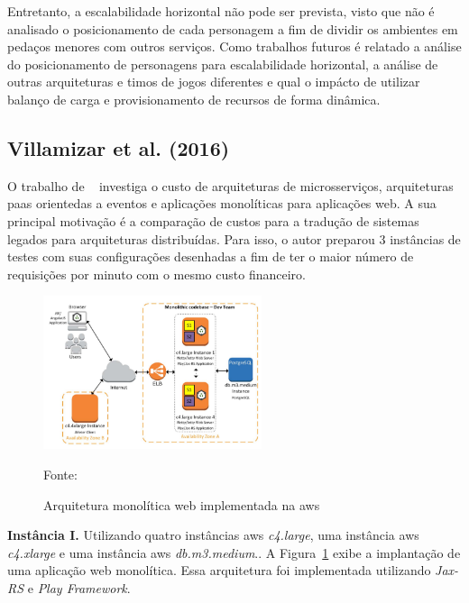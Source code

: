 Entretanto, a escalabilidade horizontal não pode ser prevista, visto que não é analisado o posicionamento de cada personagem a fim de dividir os ambientes em pedaços menores com outros serviços.
%
Como trabalhos futuros é relatado a análise do posicionamento de personagens para escalabilidade horizontal, a análise de outras arquiteturas e timos de jogos diferentes e qual o impácto de utilizar balanço de carga e provisionamento de recursos de forma dinâmica.



\subsection{Villamizar et al. (2016)}



O trabalho de ~\cite{7515686} investiga o custo de arquiteturas de microsserviços, arquiteturas \ac{paas} orientedas a eventos e aplicações monolíticas para aplicações web.
%
A sua principal motivação é a comparação de custos para a tradução de sistemas legados para arquiteturas distribuídas.
%
Para isso, o autor preparou 3 instâncias de testes com suas configurações desenhadas a fim de ter o maior número de requisições por minuto com o mesmo custo financeiro.



\begin{figure}[htb!]
\caption{Arquitetura monolítica web implementada na \ac{aws}}
\label{fig:aws_monolitico}
\includegraphics[height=4.5cm]{img/cap2/aws_monolitico.png}
\centering

Fonte:~\cite{7515686}
\end{figure}

\textbf{Instância I.} Utilizando quatro instâncias \ac{aws} \textit{c4.large}, uma instância \ac{aws} \textit{c4.xlarge} e uma instância \ac{aws} \textit{db.m3.medium}..
%
A Figura~\ref{fig:aws_monolitico} exibe a implantação de uma aplicação web monolítica.
%
Essa arquitetura foi implementada utilizando \textit{Jax-RS} e \textit{Play Framework}.




